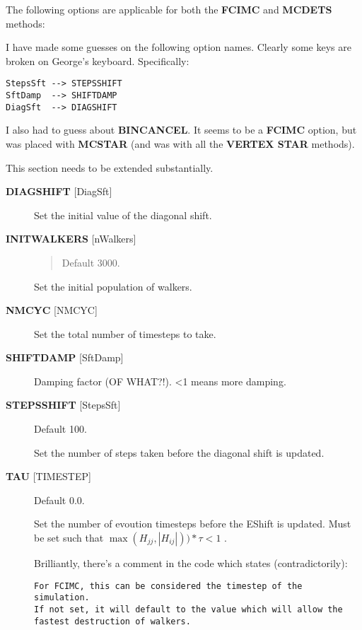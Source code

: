 \documentclass[openany,a4paper,10pt]{manual}
\begin{document}
The following options are applicable for both the \textbf{FCIMC} and \textbf{MCDETS} methods:

\begin{notice}[note]
I have made some guesses on the following option names.  Clearly some keys are broken
on George's keyboard.  Specifically:

\begin{Verbatim}[commandchars=@\[\]]
StepsSft --> STEPSSHIFT
SftDamp  --> SHIFTDAMP
DiagSft  --> DIAGSHIFT
\end{Verbatim}

I also had to guess about \textbf{BINCANCEL}.  It seems to be a \textbf{FCIMC}
option, but was placed with \textbf{MCSTAR} (and was with all the \textbf{VERTEX STAR}
methods).

This section needs to be extended substantially.
\end{notice}
\begin{description}
\item[\textbf{DIAGSHIFT} {[}DiagSft{]}]
Set the initial value of the diagonal shift.

\item[\textbf{INITWALKERS} {[}nWalkers{]}]\begin{quote}

Default 3000.
\end{quote}

Set the initial population of walkers.

\item[\textbf{NMCYC} {[}NMCYC{]}]
Set the total number of timesteps to take.

\item[\textbf{SHIFTDAMP}  {[}SftDamp{]}]
Damping factor (OF WHAT?!).  \textless{}1 means more damping.

\item[\textbf{STEPSSHIFT} {[}StepsSft{]}]
Default 100.

Set the number of steps taken before the diagonal shift is updated.

\item[\textbf{TAU} {[}TIMESTEP{]}]
Default 0.0.

Set the number of evoution timesteps before
the EShift is updated.  Must be set such that
$\operatorname{max}(H_{jj},|H_{ij}|))*\tau<1$ .

\begin{notice}[note]
Brilliantly, there's a comment in the code which states (contradictorily):

\begin{Verbatim}[commandchars=@\[\]]
For FCIMC, this can be considered the timestep of the simulation.
If not set, it will default to the value which will allow the
fastest destruction of walkers.
\end{Verbatim}
\end{notice}

\end{description}
\end{document}
